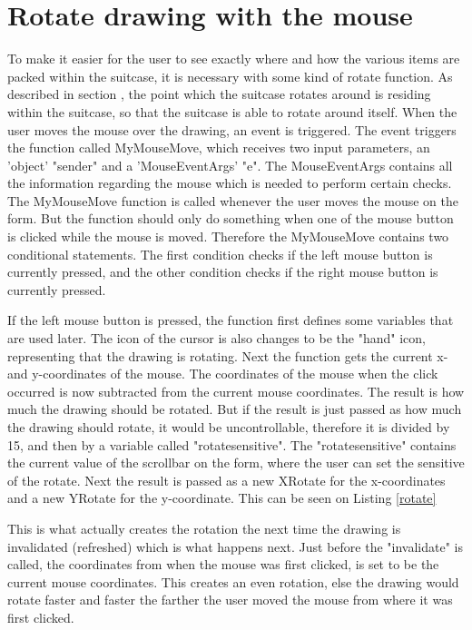 \section{Rotate drawing with the mouse}

To make it easier for the user to see exactly where and how the various items are packed within the suitcase, it is necessary with some kind of rotate function. As described in section , the point which the suitcase rotates around is residing within the suitcase, so that the suitcase is able to rotate around itself. When the user moves the mouse over the drawing, an event is triggered. The event triggers the function called MyMouseMove, which receives two input parameters, an 'object' "sender" and a 'MouseEventArgs' "e". The MouseEventArgs contains all the information regarding the mouse which is needed to perform certain checks. The MyMouseMove function is called whenever the user moves the mouse on the form. But the function should only do something when one of the mouse button is clicked while the mouse is moved. Therefore the MyMouseMove contains two conditional statements. The first condition checks if the left mouse button is currently pressed, and the other condition checks if the right mouse button is currently pressed.

If the left mouse button is pressed, the function first defines some variables that are used later. The icon of the cursor is also changes to be the "hand" icon, representing that the drawing is rotating. Next the function gets the current x- and y-coordinates of the mouse. The coordinates of the mouse when the click occurred is now subtracted from the current mouse coordinates. The result is how much the drawing should be rotated. But if the result is just passed as how much the drawing should rotate, it would be uncontrollable, therefore it is divided by 15, and then by a variable called "rotatesensitive". The "rotatesensitive" contains the current value of the scrollbar on the form, where the user can set the sensitive of the rotate. Next the result is passed as a new XRotate for the x-coordinates and a new YRotate for the y-coordinate. This can be seen on Listing \ref{rotate}


This is what actually creates the rotation the next time the drawing is invalidated (refreshed) which is what happens next. Just before the "invalidate" is called, the coordinates from when the mouse was first clicked, is set to be the current mouse coordinates. This creates an even rotation, else the drawing would rotate faster and faster the farther the user moved the mouse from where it was first clicked. 